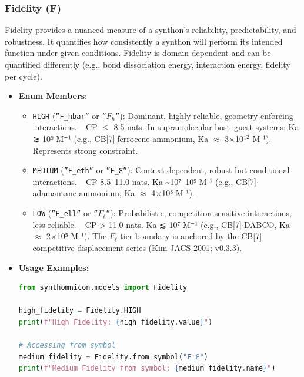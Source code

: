 \documentclass[12pt,a4paper]{article}
\begin{document}
\subsubsection{Fidelity (F)}

Fidelity provides a nuanced measure of a synthon's reliability, predictability, and robustness. It quantifies how consistently a synthon will perform its intended function under given conditions. Fidelity is domain-dependent and can be quantified differently (e.g., bond dissociation energy, interaction energy, fidelity per cycle).

\begin{itemize}
    \item 
    \textbf{Enum Members}:

    \begin{itemize}
    \item \texttt{HIGH} (\texttt{''F\_hbar''} or \texttt{''$F_{\hbar}$''}): Dominant, highly reliable, geometry-enforcing interactions. \xi\_CP $\leq$ 8.5 nats. In supramolecular host--guest systems: Ka ≳ 10⁹ M⁻¹ (e.g., CB{[}7{]}$\cdot$ferrocene-ammonium, Ka $\approx$ 3$\times$10¹$^{2}$ M⁻¹). Represents strong constraint.
    \item \texttt{MEDIUM} (\texttt{''F\_eth''} or \texttt{''F\_ℇ''}): Context-dependent, robust but conditional interactions. \xi\_CP 8.5--11.0 nats. Ka \textasciitilde{}10⁷--10⁹ M⁻¹ (e.g., CB{[}7{]}$\cdot$adamantane-ammonium, Ka $\approx$ 4$\times$10⁸ M⁻¹).
    \item \texttt{LOW} (\texttt{''F\_ell''} or \texttt{''$F_{\ell}$''}): Probabilistic, competition-sensitive interactions, less reliable. \xi\_CP \textgreater{} 11.0 nats. Ka ≲ 10⁷ M⁻¹ (e.g., CB{[}7{]}$\cdot$DABCO, Ka $\approx$ 2$\times$10⁵ M⁻¹). The $F_{\ell}$ tier boundary is anchored by the CB{[}7{]} competitive displacement series (Kim JACS 2001; v0.3.3).
\end{itemize}

    \item 
    \textbf{Usage Examples}:

    \begin{lstlisting}[language=Python]
from synthomnicon.models import Fidelity

high_fidelity = Fidelity.HIGH
print(f"High Fidelity: {high_fidelity.value}")

# Accessing from symbol
medium_fidelity = Fidelity.from_symbol("F_ℇ")
print(f"Medium Fidelity from symbol: {medium_fidelity.name}")
\end{lstlisting}


\end{itemize}
\end{document}
